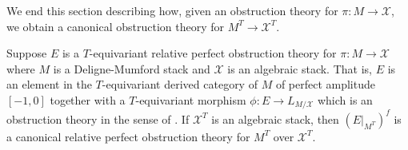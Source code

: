 \documentclass[12pt,dvipsnames]{amsart}
\begin{document}
We end this section describing how, given an obstruction theory for \(\pi:M\to \mathcal X\), we obtain a canonical obstruction theory for \(M^T\to \mathcal X^T\).
\begin{lemma}\label{lem:obstruction-theory-for-the-fixed-locus}
  Suppose \(E\) is a \(T\)-equivariant relative perfect obstruction theory for \(\pi:M\to \mathcal X\) where \(M\) is a Deligne-Mumford stack and \(\mathcal X\) is an algebraic stack. That is, \(E\) is an element in the \(T\)-equivariant derived category of \(M\) of perfect amplitude \([-1,0]\) together with a \(T\)-equivariant morphism \(\phi: E\to L_{M/\mathcal X}\) which is an obstruction theory in the sense of \cite[Definition 4.4]{behrend-fantechi_IntrinsicNormalCone1997}. If \(\mathcal X^T\) is an algebraic stack, then \((E|_{M^T})^f\) is a canonical relative perfect obstruction theory for \(M^T\) over \(\mathcal X^T\).
\end{lemma}
\end{document}
